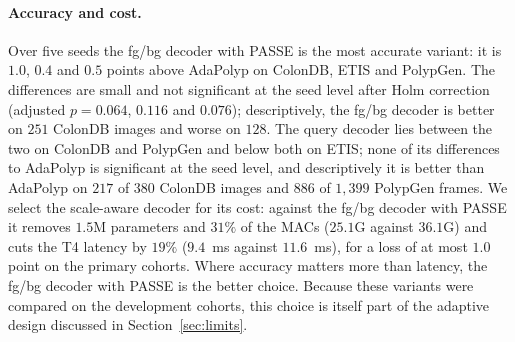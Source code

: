 \documentclass{ieeeaccess}
\begin{document}
\paragraph{Accuracy and cost.} Over five seeds the fg/bg decoder with PASSE is the most accurate variant: it is $1.0$, $0.4$ and $0.5$ points above AdaPolyp on ColonDB, ETIS and PolypGen. The differences are small and not significant at the seed level after Holm correction (adjusted $p=0.064$, $0.116$ and $0.076$); descriptively, the fg/bg decoder is better on $251$ ColonDB images and worse on $128$. The query decoder lies between the two on ColonDB and PolypGen and below both on ETIS; none of its differences to AdaPolyp is significant at the seed level, and descriptively it is better than AdaPolyp on $217$ of $380$ ColonDB images and $886$ of $1{,}399$ PolypGen frames. We select the scale-aware decoder for its cost: against the fg/bg decoder with PASSE it removes $1.5$M parameters and $31\%$ of the MACs ($25.1$G against $36.1$G) and cuts the T4 latency by $19\%$ ($9.4$~ms against $11.6$~ms), for a loss of at most $1.0$ point on the primary cohorts. Where accuracy matters more than latency, the fg/bg decoder with PASSE is the better choice. Because these variants were compared on the development cohorts, this choice is itself part of the adaptive design discussed in Section~\ref{sec:limits}.
\end{document}
